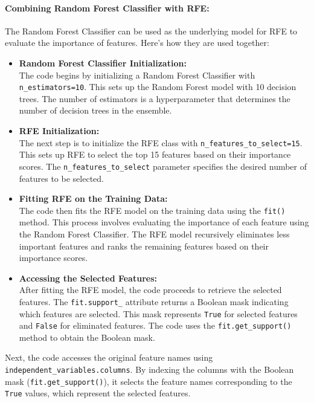 \documentclass{article}
\begin{document}
\paragraph{Combining Random Forest Classifier with RFE:}
The Random Forest Classifier can be used as the underlying model for RFE to evaluate the importance of features. Here's how they are used together:
\begin{itemize}
    \item \textbf{Random Forest Classifier Initialization:} \\
    The code begins by initializing a Random Forest Classifier with \texttt{n\_estimators=10}. This sets up the Random Forest model with 10 decision trees. The number of estimators is a hyperparameter that determines the number of decision trees in the ensemble. 
    
    \item \textbf{RFE Initialization:} \\
    The next step is to initialize the RFE class with \texttt{n\_features\_to\_select=15}. This sets up RFE to select the top 15 features based on their importance scores. The \texttt{n\_features\_to\_select} parameter specifies the desired number of features to be selected.

    \item \textbf{Fitting RFE on the Training Data:} \\
    The code then fits the RFE model on the training data using the \texttt{fit()} method. This process involves evaluating the importance of each feature using the Random Forest Classifier. The RFE model recursively eliminates less important features and ranks the remaining features based on their importance scores.

    \item \textbf{Accessing the Selected Features:} \\
    After fitting the RFE model, the code proceeds to retrieve the selected features. The \texttt{fit.support\_} attribute returns a Boolean mask indicating which features are selected. This mask represents \texttt{True} for selected features and \texttt{False} for eliminated features. The code uses the \texttt{fit.get\_support()} method to obtain the Boolean mask.

\end{itemize}

Next, the code accesses the original feature names using \texttt{independent\_variables.columns}. By indexing the columns with the Boolean mask (\texttt{fit.get\_support()}), it selects the feature names corresponding to the \texttt{True} values, which represent the selected features.
\end{document}
